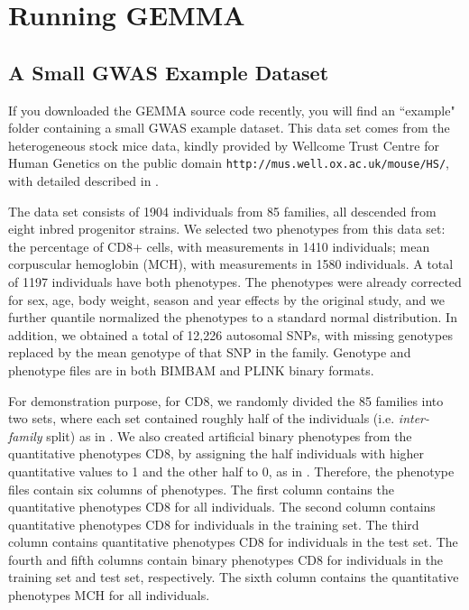 \documentclass[11pt]{article}
\providecommand{\url}[1]{\texttt{#1}}
\begin{document}
\newpage

\section{Running GEMMA}

\subsection{A Small GWAS Example Dataset}

If you downloaded the GEMMA source code recently, you will find an
``example" folder containing a small GWAS example dataset. This data
set comes from the heterogeneous stock mice data, kindly provided by
Wellcome Trust Centre for Human Genetics on the public domain
\url{http://mus.well.ox.ac.uk/mouse/HS/}, with detailed described in
\cite{Valdar:2006}.

The data set consists of 1904 individuals from 85 families, all
descended from eight inbred progenitor strains. We selected two
phenotypes from this data set: the percentage of CD8+ cells, with
measurements in 1410 individuals; mean corpuscular hemoglobin (MCH),
with measurements in 1580 individuals. A total of 1197 individuals
have both phenotypes. The phenotypes were already corrected for sex,
age, body weight, season and year effects by the original study, and
we further quantile normalized the phenotypes to a standard normal
distribution. In addition, we obtained a total of 12,226 autosomal
SNPs, with missing genotypes replaced by the mean genotype of that SNP
in the family. Genotype and phenotype files are in both BIMBAM and
PLINK binary formats.

For demonstration purpose, for CD8, we randomly divided the 85
families into two sets, where each set contained roughly half of the
individuals (i.e. {\it inter-family} split) as in \cite{Zhou:2013}. We
also created artificial binary phenotypes from the quantitative
phenotypes CD8, by assigning the half individuals with higher
quantitative values to 1 and the other half to 0, as in
\cite{Zhou:2013}. Therefore, the phenotype files contain six columns
of phenotypes. The first column contains the quantitative phenotypes
CD8 for all individuals. The second column contains quantitative
phenotypes CD8 for individuals in the training set. The third column
contains quantitative phenotypes CD8 for individuals in the test
set. The fourth and fifth columns contain binary phenotypes CD8 for
individuals in the training set and test set, respectively. The sixth
column contains the quantitative phenotypes MCH for all individuals.
\end{document}
